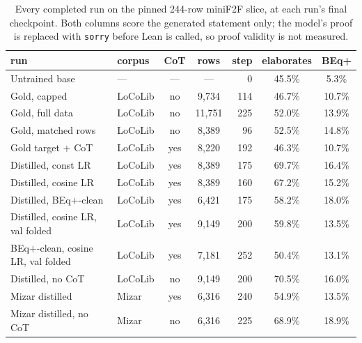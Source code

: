 \begin{table}[t]
\centering
\small
\begin{tabular}{llccrcc}
\toprule
run & corpus & CoT & rows & step & elaborates & BEq+ \\
\midrule
Untrained base & --- & --- & --- & 0 & 45.5\% & 5.3\% \\
Gold, capped & LoCoLib & no & 9,734 & 114 & 46.7\% & 10.7\% \\
Gold, full data & LoCoLib & no & 11,751 & 225 & 52.0\% & 13.9\% \\
Gold, matched rows & LoCoLib & no & 8,389 & 96 & 52.5\% & 14.8\% \\
Gold target $+$ CoT & LoCoLib & yes & 8,220 & 192 & 46.3\% & 10.7\% \\
Distilled, const LR & LoCoLib & yes & 8,389 & 175 & 69.7\% & 16.4\% \\
Distilled, cosine LR & LoCoLib & yes & 8,389 & 160 & 67.2\% & 15.2\% \\
Distilled, BEq$+$-clean & LoCoLib & yes & 6,421 & 175 & 58.2\% & 18.0\% \\
Distilled, cosine LR, val folded & LoCoLib & yes & 9,149 & 200 & 59.8\% & 13.5\% \\
BEq$+$-clean, cosine LR, val folded & LoCoLib & yes & 7,181 & 252 & 50.4\% & 13.1\% \\
Distilled, no CoT & LoCoLib & no & 9,149 & 200 & 70.5\% & 16.0\% \\
Mizar distilled & Mizar & yes & 6,316 & 240 & 54.9\% & 13.5\% \\
Mizar distilled, no CoT & Mizar & no & 6,316 & 225 & 68.9\% & 18.9\% \\
\bottomrule
\end{tabular}
\caption{Every completed run on the pinned 244-row miniF2F slice, at each run's final checkpoint. Both columns score the generated statement only; the model's proof is replaced with \texttt{sorry} before Lean is called, so proof validity is not measured.}
\label{tab:all-runs}
\end{table}

